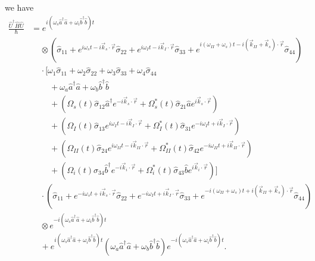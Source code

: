 \documentclass[aps,pra,showpacs,amsmath,amssymb,nofootinbib,longbibliography,superscriptaddress
]{revtex4-1}
\theoremstyle{definition}
\theoremstyle{remark}
\newcommand{\0}{\hat{0}}
\begin{document}
we have
\begin{align}
    \frac{\hat{U}^{\dagger} \hat{H} \hat{U}}{\hbar}
    &= e^{i(\omega_s \hat{a}^{\dagger} \hat{a} + \omega_i \hat{b}^{\dagger} \hat{b})t} \nonumber \\
    &\;\;\;\;\otimes
    \left(\hat{\sigma}_{11} + e^{i \omega_s t - i \vec{k}_s \cdot \vec{r}} \hat{\sigma}_{22} + e^{i \omega_I t - i \vec{k}_I \cdot \vec{r}} \hat{\sigma}_{33} + e^{i(\omega_{II} + \omega_s) t - i(\vec{k}_{II} + \vec{k}_s) \cdot \vec{r}} \hat{\sigma}_{44}\right) \nonumber\\
    &\;\;\;\;\cdot\biggl[
        \omega_1 \hat{\sigma}_{11} + \omega_2 \hat{\sigma}_{22} + \omega_3 \hat{\sigma}_{33} + \omega_4 \hat{\sigma}_{44}\nonumber \\
        &\;\;\;\;\;\;\;\;+ \omega_{a} \hat{a}^{\dagger} \hat{a} + \omega_{b} \hat{b}^{\dagger} \hat{b}\nonumber \\
        &\;\;\;\;\;\;\;\;+ \left(\Omega_{s}(t) \hat{\sigma}_{12} \hat{a}^{\dagger} e^{-i \vec{k}_{s} \cdot \vec{r}} + \Omega_{s}^*(t) \hat{\sigma}_{21} \hat{a} e^{i \vec{k}_{s} \cdot \vec{r}}\right)\nonumber \\
        &\;\;\;\;\;\;\;\;+ \left(\Omega_{I}(t) \hat{\sigma}_{13} e^{i \omega_I t - i \vec{k}_I \cdot \vec{r}} + \Omega_{I}^*(t) \hat{\sigma}_{31} e^{-i \omega_I t + i \vec{k}_I \cdot \vec{r}}\right)\nonumber \\
        &\;\;\;\;\;\;\;\;+ \left(\Omega_{II}(t) \hat{\sigma}_{24} e^{i \omega_{II} t - i \vec{k}_{II} \cdot \vec{r}} + \Omega_{II}^*(t) \hat{\sigma}_{42} e^{-i \omega_{II} t + i \vec{k}_{II} \cdot \vec{r}}\right)\nonumber \\
        &\;\;\;\;\;\;\;\;+ \left(\Omega_{i}(t) \hat{\sigma}_{34} \hat{b}^{\dagger} e^{-i \vec{k}_{i} \cdot \vec{r}} + \Omega_{i}^*(t) \hat{\sigma}_{43} \hat{b} e^{i \vec{k}_{i} \cdot \vec{r}}\right)
    \biggr] \nonumber\\
    &\;\;\;\; \cdot
    \left(\hat{\sigma}_{11} + e^{-i \omega_s t + i \vec{k}_s \cdot \vec{r}} \hat{\sigma}_{22} + e^{-i \omega_I t + i \vec{k}_I \cdot \vec{r}} \hat{\sigma}_{33} + e^{-i(\omega_{II} + \omega_s) t + i(\vec{k}_{II} + \vec{k}_s) \cdot \vec{r}} \hat{\sigma}_{44}\right) \nonumber \\
    &\;\;\;\;\otimes e^{-i(\omega_s \hat{a}^{\dagger} \hat{a} + \omega_i \hat{b}^{\dagger} \hat{b})t} \nonumber \\
    &\;\;\;\;+ e^{i(\omega_s \hat{a}^{\dagger} \hat{a} + \omega_i \hat{b}^{\dagger} \hat{b})t}
    \left(\omega_{a} \hat{a}^{\dagger} \hat{a} + \omega_{b} \hat{b}^{\dagger} \hat{b}\right)
    e^{-i(\omega_s \hat{a}^{\dagger} \hat{a} + \omega_i \hat{b}^{\dagger} \hat{b})t}.
\end{align}
\end{document}
